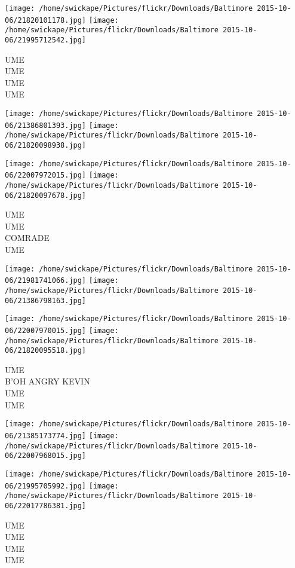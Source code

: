 \documentclass[10pt,letterpaper]{article}
\begin{document}
\texttt{[image: /home/swickape/Pictures/flickr/Downloads/Baltimore 2015-10-06/21820101178.jpg]}
\texttt{[image: /home/swickape/Pictures/flickr/Downloads/Baltimore 2015-10-06/21995712542.jpg]}

UME\\
UME\\
UME\\
UME\\
\pagebreak

\texttt{[image: /home/swickape/Pictures/flickr/Downloads/Baltimore 2015-10-06/21386801393.jpg]}
\texttt{[image: /home/swickape/Pictures/flickr/Downloads/Baltimore 2015-10-06/21820098938.jpg]}

\texttt{[image: /home/swickape/Pictures/flickr/Downloads/Baltimore 2015-10-06/22007972015.jpg]}
\texttt{[image: /home/swickape/Pictures/flickr/Downloads/Baltimore 2015-10-06/21820097678.jpg]}

UME\\
UME\\
COMRADE\\
UME\\
\pagebreak

\texttt{[image: /home/swickape/Pictures/flickr/Downloads/Baltimore 2015-10-06/21981741066.jpg]}
\texttt{[image: /home/swickape/Pictures/flickr/Downloads/Baltimore 2015-10-06/21386798163.jpg]}

\texttt{[image: /home/swickape/Pictures/flickr/Downloads/Baltimore 2015-10-06/22007970015.jpg]}
\texttt{[image: /home/swickape/Pictures/flickr/Downloads/Baltimore 2015-10-06/21820095518.jpg]}

UME\\
B'OH ANGRY KEVIN\\
UME\\
UME\\
\pagebreak

\texttt{[image: /home/swickape/Pictures/flickr/Downloads/Baltimore 2015-10-06/21385173774.jpg]}
\texttt{[image: /home/swickape/Pictures/flickr/Downloads/Baltimore 2015-10-06/22007968015.jpg]}

\texttt{[image: /home/swickape/Pictures/flickr/Downloads/Baltimore 2015-10-06/21995705992.jpg]}
\texttt{[image: /home/swickape/Pictures/flickr/Downloads/Baltimore 2015-10-06/22017786381.jpg]}

UME\\
UME\\
UME\\
UME\\
\pagebreak
\end{document}
